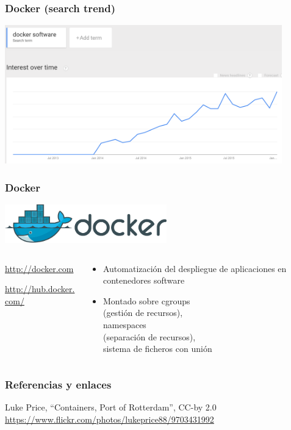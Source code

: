 \begin{frame}
\frametitle{Docker (search trend)}

\includegraphics[width=12cm]{figs/docker-trend}


\end{frame}

\begin{frame}
\frametitle{Docker}

\includegraphics[width=7cm]{figs/docker-logo}

\begin{columns}[T]
\begin{column}{.38\textwidth}

\begin{flushright}
{\Large
  \url{http://docker.com} 

  \vspace{1cm}

  \url{http://hub.docker.com/}
}
\end{flushright}

\end{column}%
\hfill%
\begin{column}{.60\textwidth}
{\Large
\begin{itemize}
\item Automatización del despliegue de aplicaciones en contenedores software
\item Montado sobre cgroups \\ (gestión de recursos), \\
  namespaces \\ (separación de recursos), \\
  sistema de ficheros con unión \\
\end{itemize}
}
\end{column}%
\end{columns}

\end{frame}

\begin{frame}
\frametitle{Referencias y enlaces}

\begin{flushright}
  Luke Price, ``Containers, Port of Rotterdam'', CC-by 2.0 \\
  \url{https://www.flickr.com/photos/lukeprice88/9703431992} \\
\end{flushright}  

\end{frame}






